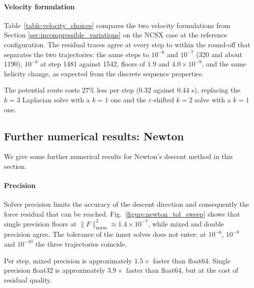 \documentclass[%
 reprint,
 superscriptaddress,
 amsmath,amssymb,
 aps, nofootinbib, floatfix]{revtex4-2}
\begin{document}
\paragraph{Velocity formulation}
Table~\ref{table:velocity_choices} compares the two velocity formulations from Section \ref{sec:incompressible_variations} on the NCSX case at the reference configuration. The residual traces agree at every step to within the round-off that separates the two trajectories: the same steps to $10^{-6}$ and $10^{-7}$ (320 and about 1190), $10^{-8}$ at step 1481 against 1542, floors of $1.9$ and $4.0 \times 10^{-9}$, and the same helicity change, as expected from the discrete sequence properties.

The potential route costs $27\%$ less per step ($0.32$ against $0.44$ s), replacing the $k = 3$ Laplacian solve with a $k = 1$ one and the $\varepsilon$-shifted $k = 2$ solve with a $k = 1$ one.

\begin{table}[htb]
\caption{Velocity formulations: potential and Leray projection. Performance is essentially identical, but the potential route is faster and extends to Newton's method.}

\label{table:velocity_choices}
\end{table}

\subsection{Further numerical results: Newton}
\label{subsec:further_numerics_newton}

We give some further numerical results for Newton's descent method in this section.

\paragraph{Precision}
Solver precision limits the accuracy of the descent direction and consequently the force residual that can be reached. Fig.~\ref{figure:newton_tol_sweep} shows that single precision floors at $\| F \|_{\text{norm}}^2 \approx 1.4 \times 10^{-7}$, while mixed and double precision agree. The tolerance of the inner solves does not enter: at $10^{-6}$, $10^{-8}$ and $10^{-10}$ the three trajectories coincide. 

Per step, mixed precision is approximately $1.5 \times$ faster than float64. Single precision float32 is approximately $3.9 \times$ faster than float64, but at the cost of residual quality.
\end{document}
